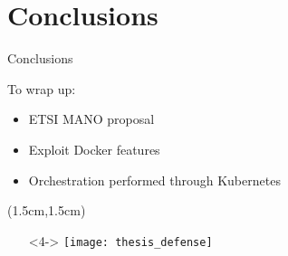 \section{Conclusions}
\begin{frame}{Conclusions}

  To wrap up:
  \begin{itemize}
  \item<1-> ETSI MANO proposal
  \item<2-> Exploit Docker features
  \item<3-> Orchestration performed through Kubernetes
  \end{itemize}

  \begin{textblock*}{5cm}(1.5cm,1.5cm)
    \begin{itemize}
      \item[]<4-> \centering \texttt{[image: thesis\_defense]}
    \end{itemize}
  \end{textblock*}
\end{frame}
